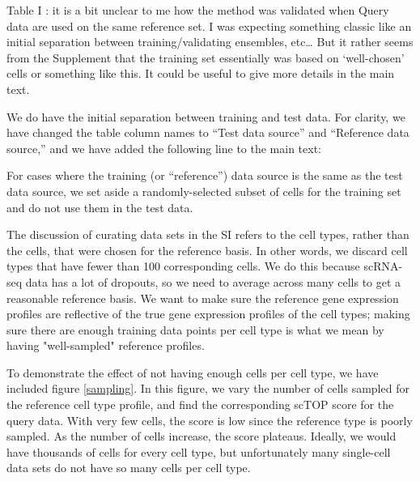 \documentclass[12pt,american]{scrartcl}
\begin{document}
\begin{revcomment}
    Table I : it is a bit unclear to me how the method was validated when 
Query data are used on the same reference set. I was expecting something
 classic like an initial separation between training/validating 
ensembles, etc… But it rather seems from the Supplement that the 
training set essentially was based on ‘well-chosen’ cells or something 
like this. It could be useful to give more details in the main text.
\end{revcomment}
\begin{revresponse}
    We do have the initial separation between training and test data. For clarity, we have changed the table column names to ``Test data source'' and ``Reference data source,'' and we have added the following line to the main text:
    \begin{changes}
        For cases where the training (or ``reference'') data source is the same as the test data source, we set aside a randomly-selected subset of cells for the training set and do not use them in the test data.
    \end{changes}

    The discussion of curating data sets in the SI refers to the cell types, rather than the cells, that were chosen for the reference basis. In other words, we discard cell types that have fewer than 100 corresponding cells. We do this because scRNA-seq data has a lot of dropouts, so we need to average across many cells to get a reasonable reference basis. We want to make sure the reference gene expression profiles are reflective of the true gene expression profiles of the cell types; making sure there are enough training data points per cell type is what we mean by having "well-sampled" reference profiles.

    To demonstrate the effect of not having enough cells per cell type, we have included figure \ref{sampling}. In this figure, we vary the number of cells sampled for the reference cell type profile, and find the corresponding scTOP score for the query data. With very few cells, the score is low since the reference type is poorly sampled. As the number of cells increase, the score plateaus. Ideally, we would have thousands of cells for every cell type, but unfortunately many single-cell data sets do not have so many cells per cell type.


\end{revresponse}
\end{document}
